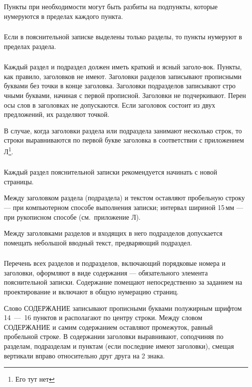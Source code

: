 Пункты при необходимости могут быть разбиты на подпункты, которые нумеруются в пределах каждого пункта. 

\subsubsection{}
Если в пояснительной записке выделены только разделы, то пункты нумеруют в пределах раздела.

\subsubsection{}
Каждый раздел и подраздел должен иметь краткий и ясный заголо-вок. Пункты, как правило, заголовков не имеют. Заголовки разделов записывают прописными буквами без точки в конце заголовка. Заголовки подразделов записывают стро чными буквами, начиная с первой прописной. Заголовки не подчеркивают. Перен осы слов в заголовках не допускаются. Если заголовок состоит из двух предложений, их разделяют точкой.

В случае, когда заголовки раздела или подраздела занимают несколько строк, то строки выравниваются  по первой букве  заголовка  в соответствии с приложением Л\footnote{Его тут нет}.

\subsubsection{}
Каждый раздел пояснительной записки рекомендуется начинать с новой страницы. 

Между заголовком раздела (подраздела) и текстом оставляют пробельную строку --- при компьютерном способе выполнения  записки;  интервал  шириной 15\,мм --- при рукописном способе (см.~приложение Л).

Между заголовками разделов и входящих в него подразделов допускается помещать небольшой вводный текст, предваряющий подраздел.

\subsubsection{}
Перечень всех разделов и подразделов, включающий порядковые номера и заголовки, оформляют в виде содержания --- обязательного элемента пояснительной записки. Содержание помещают непосредственно за заданием на проектирование и включают в общую нумерацию страниц.

Слово \MakeUppercase{содержание} записывают прописными буквами полужирным шрифтом 14~---~16 пунктов и располагают по центру строки. Между словом \MakeUppercase{содержание} и самим содержанием оставляют промежуток, равный пробельной строке. В содержании заголовки выравнивают, соподчиняя по разделам, подразделам и пунктам (если последние имеют заголовки), смещая вертикали вправо относительно друг друга на 2 знака.

